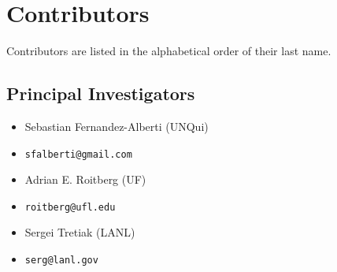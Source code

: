     \section{Contributors}
Contributors are listed in 
the alphabetical order of their last name.
\subsection{Principal Investigators}
\begin{itemize}
\item Sebastian Fernandez-Alberti (UNQui)
\item[] \vspace*{-.75em}\verb+sfalberti@gmail.com+
\item Adrian E. Roitberg (UF)
\item[] \vspace*{-.75em}\verb+roitberg@ufl.edu+
\item Sergei Tretiak (LANL)
\item[] \vspace*{-.75em}\verb+serg@lanl.gov+
\end{itemize}
